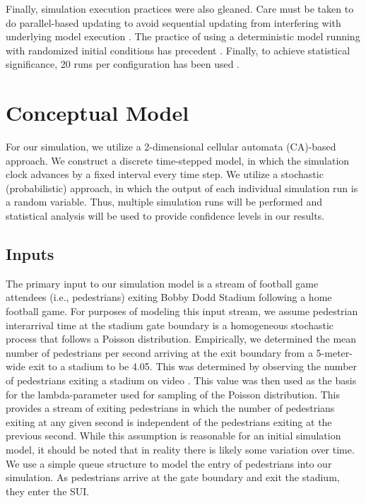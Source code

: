 \documentclass[12pt]{article}
\begin{document}
Finally, simulation execution practices were also gleaned. Care must be taken
to do parallel-based updating to avoid sequential updating from interfering with
underlying model execution \cite{blue2001cellular}. The practice of using
a deterministic model running with randomized initial conditions has precedent
\cite{biham1992self}. Finally, to achieve statistical significance, 20 runs per
configuration has been used \cite{blue2001cellular}.

\section{Conceptual Model}
For our simulation, we utilize a 2-dimensional cellular automata (CA)-based
approach. We construct a discrete time-stepped model, in which the simulation
clock advances by a fixed interval every time step. We utilize a stochastic
(probabilistic) approach, in which the output of each individual simulation
run is a random variable. Thus, multiple simulation runs will be performed and
statistical analysis will be used to provide confidence levels in our results.

\subsection{Inputs}
The primary input to our simulation model is a stream of football game attendees
(i.e., pedestrians) exiting Bobby Dodd Stadium following a home football game.
For purposes of modeling this input stream, we assume pedestrian interarrival
time at the stadium gate boundary is a homogeneous stochastic process that
follows a Poisson distribution. Empirically, we determined the mean number of
pedestrians per second arriving at the exit boundary from a 5-meter-wide exit to
a stadium to be 4.05. This was determined by observing the number of pedestrians
exiting a stadium on video \cite{youtubestadium}. This value was then used as
the basis for the lambda-parameter used for sampling of the Poisson
distribution. This provides a stream of exiting pedestrians in which the number
of pedestrians exiting at any given second is independent of the pedestrians
exiting at the previous second. While this assumption is reasonable for an
initial simulation model, it should be noted that in reality there is likely
some variation over time. We use a simple queue structure to model the entry of
pedestrians into our simulation. As pedestrians arrive at the gate boundary and
exit the stadium, they enter the SUI.
\end{document}
